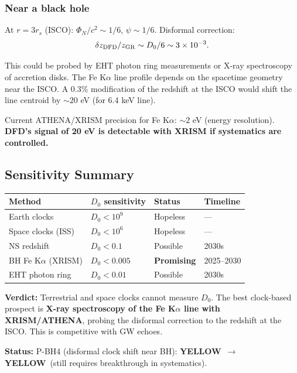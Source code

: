 \documentclass[11pt,a4paper]{article}
\newcommand{\YELLOW}{\textcolor{dfdyellow}{\textbf{YELLOW}}}
\begin{document}
\subsubsection{Near a black hole}

At $r = 3r_s$ (ISCO): $\Phi_N/c^2 \sim 1/6$, $\psi \sim 1/6$. Disformal correction:
\begin{equation}
\delta z_{\rm DFD}/z_{\rm GR} \sim D_0/6 \sim 3 \times 10^{-3}.
\end{equation}

This could be probed by EHT photon ring measurements or X-ray spectroscopy of accretion disks. The Fe K$\alpha$ line profile depends on the spacetime geometry near the ISCO. A 0.3\% modification of the redshift at the ISCO would shift the line centroid by $\sim 20$ eV (for 6.4 keV line).

Current ATHENA/XRISM precision for Fe K$\alpha$: $\sim 2$ eV (energy resolution). \textbf{DFD's signal of 20 eV is detectable with XRISM if systematics are controlled.}

\subsection{Sensitivity Summary}

\begin{center}
\begin{tabular}{llll}
\toprule
\textbf{Method} & \textbf{$D_0$ sensitivity} & \textbf{Status} & \textbf{Timeline} \\
\midrule
Earth clocks & $D_0 < 10^{9}$ & Hopeless & --- \\
Space clocks (ISS) & $D_0 < 10^{6}$ & Hopeless & --- \\
NS redshift & $D_0 < 0.1$ & Possible & 2030s \\
BH Fe K$\alpha$ (XRISM) & $D_0 < 0.005$ & \textbf{Promising} & 2025--2030 \\
EHT photon ring & $D_0 < 0.01$ & Possible & 2030s \\
\bottomrule
\end{tabular}
\end{center}

\textbf{Verdict:} Terrestrial and space clocks cannot measure $D_0$. The best clock-based prospect is \textbf{X-ray spectroscopy of the Fe K$\alpha$ line with XRISM/ATHENA}, probing the disformal correction to the redshift at the ISCO. This is competitive with GW echoes.

\textbf{Status:} P-BH4 (disformal clock shift near BH): \YELLOW\ $\to$ \YELLOW\ (still requires breakthrough in systematics).
\end{document}
